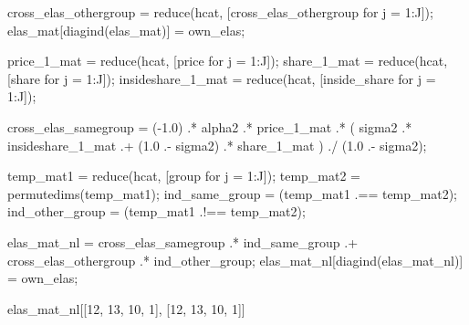 \documentclass[
  letterpaper,
  DIV=11,
  numbers=noendperiod]{scrreprt}
\newenvironment{Shaded}{\begin{snugshade}}{\end{snugshade}}
\newcommand{\FloatTok}[1]{\textcolor[rgb]{0.68,0.00,0.00}{#1}}
\newcommand{\FunctionTok}[1]{\textcolor[rgb]{0.28,0.35,0.67}{#1}}
\newcommand{\NormalTok}[1]{\textcolor[rgb]{0.00,0.23,0.31}{#1}}
\newcommand{\OperatorTok}[1]{\textcolor[rgb]{0.37,0.37,0.37}{#1}}
\begin{document}
\begin{Shaded}
\begin{Highlighting}[]
\NormalTok{cross\_elas\_othergroup }\OperatorTok{=} \FunctionTok{reduce}\NormalTok{(hcat, [cross\_elas\_othergroup for j }\OperatorTok{=} \FloatTok{1}\OperatorTok{:}\NormalTok{J]);}
\NormalTok{elas\_mat[}\FunctionTok{diagind}\NormalTok{(elas\_mat)] }\OperatorTok{=}\NormalTok{ own\_elas;}

\NormalTok{price\_1\_mat       }\OperatorTok{=} \FunctionTok{reduce}\NormalTok{(hcat, [price for j }\OperatorTok{=} \FloatTok{1}\OperatorTok{:}\NormalTok{J]);}
\NormalTok{share\_1\_mat       }\OperatorTok{=} \FunctionTok{reduce}\NormalTok{(hcat, [share for j }\OperatorTok{=} \FloatTok{1}\OperatorTok{:}\NormalTok{J]);}
\NormalTok{insideshare\_1\_mat }\OperatorTok{=} \FunctionTok{reduce}\NormalTok{(hcat, [inside\_share for j }\OperatorTok{=} \FloatTok{1}\OperatorTok{:}\NormalTok{J]);}

\NormalTok{cross\_elas\_samegroup }\OperatorTok{=}\NormalTok{ (}\OperatorTok{{-}}\FloatTok{1.0}\NormalTok{) }\OperatorTok{.*}\NormalTok{ alpha2 }\OperatorTok{.*}\NormalTok{ price\_1\_mat }\OperatorTok{.*}\NormalTok{ (}
\NormalTok{    sigma2 }\OperatorTok{.*}\NormalTok{ insideshare\_1\_mat }\OperatorTok{.+}\NormalTok{ (}\FloatTok{1.0} \OperatorTok{.{-}}\NormalTok{ sigma2) }\OperatorTok{.*}\NormalTok{ share\_1\_mat}
\NormalTok{) }\OperatorTok{./}\NormalTok{ (}\FloatTok{1.0} \OperatorTok{.{-}}\NormalTok{ sigma2);}

\NormalTok{temp\_mat1 }\OperatorTok{=} \FunctionTok{reduce}\NormalTok{(hcat, [group for j }\OperatorTok{=} \FloatTok{1}\OperatorTok{:}\NormalTok{J]);}
\NormalTok{temp\_mat2 }\OperatorTok{=} \FunctionTok{permutedims}\NormalTok{(temp\_mat1);}
\NormalTok{ind\_same\_group  }\OperatorTok{=}\NormalTok{ (temp\_mat1 }\OperatorTok{.==}\NormalTok{ temp\_mat2);}
\NormalTok{ind\_other\_group }\OperatorTok{=}\NormalTok{ (temp\_mat1 }\OperatorTok{.!==}\NormalTok{ temp\_mat2);}

\NormalTok{elas\_mat\_nl }\OperatorTok{=}\NormalTok{ cross\_elas\_samegroup }\OperatorTok{.*}\NormalTok{ ind\_same\_group }\OperatorTok{.+}\NormalTok{ cross\_elas\_othergroup }\OperatorTok{.*}\NormalTok{ ind\_other\_group;}
\NormalTok{elas\_mat\_nl[}\FunctionTok{diagind}\NormalTok{(elas\_mat\_nl)] }\OperatorTok{=}\NormalTok{ own\_elas;}

\NormalTok{elas\_mat\_nl[[}\FloatTok{12}\NormalTok{, }\FloatTok{13}\NormalTok{, }\FloatTok{10}\NormalTok{, }\FloatTok{1}\NormalTok{], [}\FloatTok{12}\NormalTok{, }\FloatTok{13}\NormalTok{, }\FloatTok{10}\NormalTok{, }\FloatTok{1}\NormalTok{]]}
\end{Highlighting}
\end{Shaded}
\end{document}
